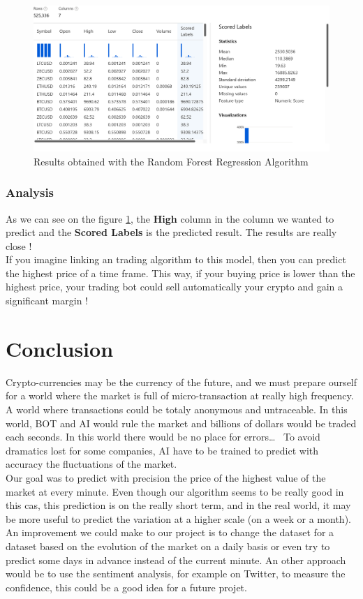 \documentclass[conference]{IEEEtran}
\begin{document}
\begin{figure}[h!]
\begin{center}
\includegraphics[scale=0.15]{rd_forest_reg.png}
\end{center}
\label{fig:results}
\caption{Results obtained with the Random Forest Regression Algorithm}
\end{figure}

\subsubsection*{Analysis} As we can see on the figure \ref{fig:results}, the \textbf{High} column in the column we wanted to predict and the \textbf{Scored Labels} is the predicted result. The results are really close !\\

If you imagine linking an trading algorithm to this model, then you can predict the highest price of a time frame. This way, if your buying price is lower than the highest price, your trading bot could sell automatically your crypto and gain a significant margin !

\section{Conclusion}

Crypto-currencies may be the currency of the future, and we must prepare ourself for a world where the market is full of micro-transaction at really high frequency. A world where transactions could be totaly anonymous and untraceable. In this world, BOT and AI would rule the market and billions of dollars would be traded each seconds. In this world there would be no place for errors\dots~ To avoid dramatics lost for some companies, AI have to be trained to predict with accuracy the fluctuations of the market. \\
Our goal was to predict with precision the price of the highest value of the market at every minute. Even though our algorithm seems to be really good in this cas, this prediction is on the really short term, and in the real world, it may be more useful to predict the variation at a higher scale (on a week or a month). An improvement we could make to our project is to change the dataset for a dataset based on the evolution of the market on a daily basis or even try to predict some days in advance instead of the current minute. An other approach would be to use the sentiment analysis, for example on Twitter, to measure the confidence, this could be a good idea for a future projet.
\end{document}
